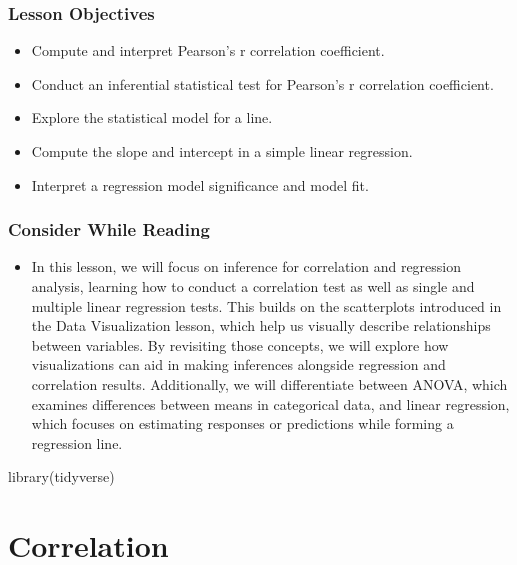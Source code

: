 \documentclass[
  letterpaper,
  DIV=11,
  numbers=noendperiod]{scrreprt}
\newenvironment{Shaded}{\begin{snugshade}}{\end{snugshade}}
\newcommand{\FunctionTok}[1]{\textcolor[rgb]{0.28,0.35,0.67}{#1}}
\newcommand{\NormalTok}[1]{\textcolor[rgb]{0.00,0.23,0.31}{#1}}
\providecommand{\tightlist}{%
  \setlength{\itemsep}{0pt}\setlength{\parskip}{0pt}}\usepackage{longtable,booktabs,array}
\begin{document}
\subsection{Lesson Objectives}\label{lesson-objectives-6}

\begin{itemize}
\tightlist
\item
  Compute and interpret Pearson's r correlation coefficient.
\item
  Conduct an inferential statistical test for Pearson's r correlation
  coefficient.
\item
  Explore the statistical model for a line.
\item
  Compute the slope and intercept in a simple linear regression.
\item
  Interpret a regression model significance and model fit.
\end{itemize}

\subsection{Consider While Reading}\label{consider-while-reading-6}

\begin{itemize}
\tightlist
\item
  In this lesson, we will focus on inference for correlation and
  regression analysis, learning how to conduct a correlation test as
  well as single and multiple linear regression tests. This builds on
  the scatterplots introduced in the Data Visualization lesson, which
  help us visually describe relationships between variables. By
  revisiting those concepts, we will explore how visualizations can aid
  in making inferences alongside regression and correlation results.
  Additionally, we will differentiate between ANOVA, which examines
  differences between means in categorical data, and linear regression,
  which focuses on estimating responses or predictions while forming a
  regression line.
\end{itemize}

\begin{Shaded}
\begin{Highlighting}[]
\FunctionTok{library}\NormalTok{(tidyverse)}
\end{Highlighting}
\end{Shaded}


\chapter{Correlation}\label{correlation}
\end{document}
